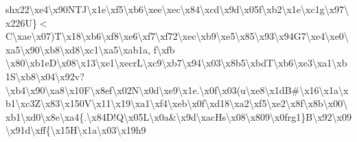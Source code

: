 \begin{DoxyCompactItemize}
sh{}x22\textbackslash{}xe4\textbackslash{}x90\+N\+T\+J\textbackslash{}x1e\textbackslash{}xf5\textbackslash{}xb6\textbackslash{}xee\textbackslash{}xec\textbackslash{}x84\textbackslash{}xcd\textbackslash{}x9d\textbackslash{}x05f\textbackslash{}xb2\textbackslash{}x1e\textbackslash{}xc1g\textbackslash{}x97\textbackslash{}x226\+U\}$<$\+C\textbackslash{}xae\textbackslash{}x07)\+T\textbackslash{}x18\textbackslash{}xb6\textbackslash{}xf8\textbackslash{}xe6\textbackslash{}xf7\textbackslash{}xf72\textbackslash{}xec\textbackslash{}xb9\textbackslash{}xe5\textbackslash{}x85\textbackslash{}x93\textbackslash{}x94\+G7\textbackslash{}xe4\textbackslash{}xe0\textbackslash{}xa5\textbackslash{}x90\textbackslash{}xb8\textbackslash{}xd8\textbackslash{}xc1\textbackslash{}xa5\textbackslash{}xab1a, f\textbackslash{}xfb \textbackslash{}x80\textbackslash{}xb1e\+D\textbackslash{}x08\textbackslash{}x13\textbackslash{}xe1\textbackslash{}xecr\+L\textbackslash{}xc9\textbackslash{}xb7\textbackslash{}x94\textbackslash{}x03\textbackslash{}x8b5\textbackslash{}xbd\+T\textbackslash{}xb6\textbackslash{}xe3\textbackslash{}xa1\textbackslash{}xb1\+S\textbackslash{}xb8\textbackslash{}x04\textbackslash{}x92v?\textbackslash{}xb4\textbackslash{}x90\textbackslash{}xa8\textbackslash{}x10\+F\textbackslash{}x8ef\textbackslash{}x02\+N\textbackslash{}x0d\textbackslash{}xe9\textbackslash{}x1e.\textbackslash{}x0f\textbackslash{}x03(u\textbackslash{}xe8\textbackslash{}x1d\+B\#\textbackslash{}x16\textbackslash{}x1a\textbackslash{}xb1\textbackslash{}xc3\+Z\textbackslash{}x83\textbackslash{}x150\+V\textbackslash{}x11\textbackslash{}x19\textbackslash{}xa1\textbackslash{}xf4\textbackslash{}xeb\textbackslash{}x0f\textbackslash{}xd18\textbackslash{}xa2\textbackslash{}xf5\textbackslash{}xe2\textbackslash{}x8f\textbackslash{}x8b\textbackslash{}x00\textbackslash{}xb1\textbackslash{}xd0\textbackslash{}x8e\textbackslash{}xa4\{.\textbackslash{}x84\+D!\+Q\textbackslash{}x05\+L\textbackslash{}x0a\&\textbackslash{}x9d\textbackslash{}xac\+Hs\textbackslash{}x08\textbackslash{}x809\textbackslash{}x0frg1\}\+B\textbackslash{}x92\textbackslash{}x09\textbackslash{}x91d\textbackslash{}xff\{\textbackslash{}x15\+H\textbackslash{}x1a\textbackslash{}x03\textbackslash{}x19h9 
\end{DoxyCompactItemize}
